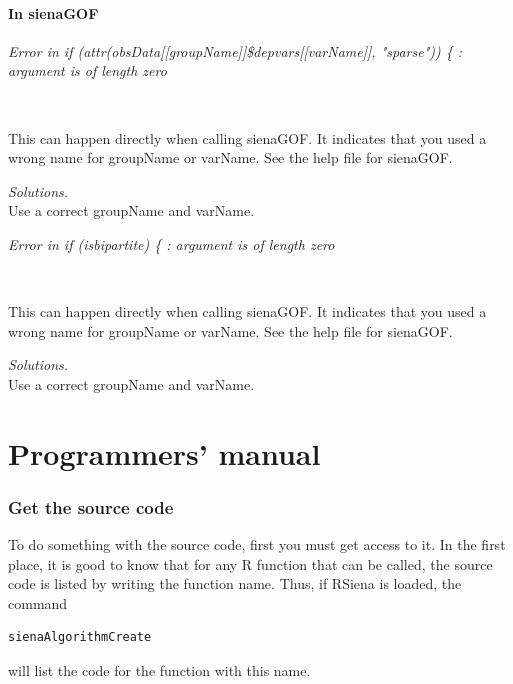 \documentclass[a4paper,fleqn,11pt]{article}
\newcommand{\+}{\, + \,}
\newcommand{\sfn}[1]{\textsf{#1}}
\newcommand{\R}{{\sf R }}
\newcommand{\RS}{{\sf RSiena }}
\begin{document}
{\subsection{In sienaGOF}


\emph{Error in if (attr(obsData[[groupName]]\$depvars[[varName]], "sparse")) \{ :\\
  argument is of length zero }
\smallskip

\begin{minipage}{0.05\textwidth}
$\phantom{abcde}$

\end{minipage}
\begin{minipage}{0.94\textwidth}
This can happen directly when calling \sfn{sienaGOF}.
It indicates that you used a wrong name for \sfn{groupName} or \sfn{varName}.
See the help file for \sfn{sienaGOF}.
\smallskip

\noindent
\emph{Solutions.} \\
Use a correct \sfn{groupName} and \sfn{varName}.
\end{minipage}
\bigskip

\noindent
\emph{Error in if (isbipartite) \{ : argument is of length zero }
\smallskip

\begin{minipage}{0.05\textwidth}
$\phantom{abcde}$

\end{minipage}
\begin{minipage}{0.94\textwidth}
This can happen directly when calling \sfn{sienaGOF}.
It indicates that you used a wrong name for \sfn{groupName} or \sfn{varName}.
See the help file for \sfn{sienaGOF}.
\smallskip

\noindent
\emph{Solutions.} \\
Use a correct \sfn{groupName} and \sfn{varName}.
\end{minipage}

\newpage
\part{Programmers' manual}

\section{Get the source code}

To do something with the source code,
first you must get access to it.
In the first place, it is good to know that for any \R function
that can be called,
the source code is listed by writing the function name.
Thus, if \RS is loaded, the command
\begin{verbatim}
sienaAlgorithmCreate
\end{verbatim}
will list the code for the function with this name.

}
\end{document}
